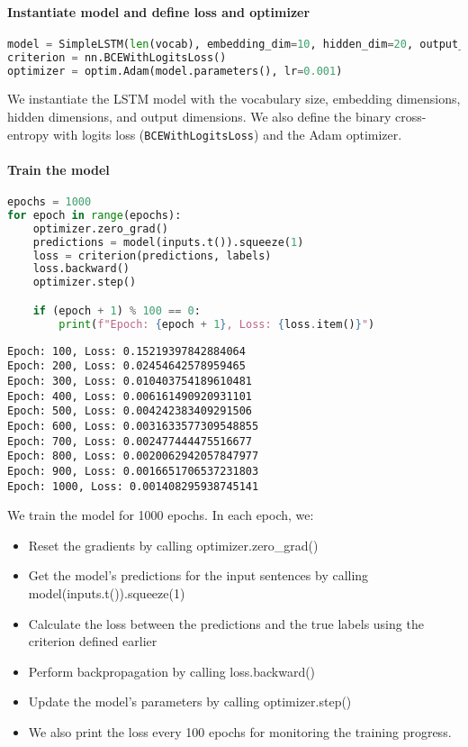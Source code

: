 \paragraph{Instantiate model and define loss and
optimizer}\label{instantiate-model-and-define-loss-and-optimizer}

\begin{lstlisting}[language=Python]
model = SimpleLSTM(len(vocab), embedding_dim=10, hidden_dim=20, output_dim=1)
criterion = nn.BCEWithLogitsLoss()
optimizer = optim.Adam(model.parameters(), lr=0.001)
\end{lstlisting}

We instantiate the LSTM model with the vocabulary size, embedding
dimensions, hidden dimensions, and output dimensions. We also define the
binary cross-entropy with logits loss
(\lstinline{BCEWithLogitsLoss}) and the Adam optimizer.

\paragraph{Train the model}\label{train-the-model}

\begin{lstlisting}[language=Python]
epochs = 1000
for epoch in range(epochs):
    optimizer.zero_grad()
    predictions = model(inputs.t()).squeeze(1)
    loss = criterion(predictions, labels)
    loss.backward()
    optimizer.step()

    if (epoch + 1) % 100 == 0:
        print(f"Epoch: {epoch + 1}, Loss: {loss.item()}")
\end{lstlisting}

\begin{lstlisting}
Epoch: 100, Loss: 0.15219397842884064
Epoch: 200, Loss: 0.02454642578959465
Epoch: 300, Loss: 0.010403754189610481
Epoch: 400, Loss: 0.006161490920931101
Epoch: 500, Loss: 0.004242383409291506
Epoch: 600, Loss: 0.0031633577309548855
Epoch: 700, Loss: 0.002477444475516677
Epoch: 800, Loss: 0.0020062942057847977
Epoch: 900, Loss: 0.0016651706537231803
Epoch: 1000, Loss: 0.001408295938745141
\end{lstlisting}

We train the model for 1000 epochs. In each epoch, we:

\begin{itemize}
\item Reset the gradients by calling optimizer.zero\_grad()
\item Get the model's predictions for the input sentences by calling model(inputs.t()).squeeze(1)
\item Calculate the loss between the predictions and the true labels using the criterion defined earlier
\item Perform backpropagation by calling loss.backward()
\item Update the model's parameters by calling optimizer.step()
\item We also print the loss every 100 epochs for monitoring the training progress.
\end{itemize}

